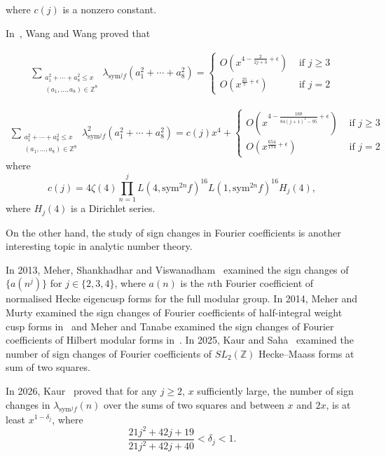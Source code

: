 \documentclass[10pt]{amsart}
\begin{document}
where $c(j)$ is a nonzero constant.


In~\cite{Junjie2026}, Wang and Wang proved that

\begin{align}
    \sum_{\substack{a_{1}^{2}+\cdots+a_{8}^{2}\leq x \\ (a_{1},\ldots,a_{8})\in\mathbb{Z}^{8}}}\lambda_{\mathrm{sym}^{j}f}(a_{1}^{2}+\cdots+a_{8}^{2}) = \begin{cases}
        O(x^{4-\frac{2}{2j+3}+\epsilon}) & \text{ if } j \geq 3 \\
        O(x^{\frac{25}{7}+\epsilon}) & \text{ if } j=2
    \end{cases}   
\end{align}

\begin{align*}
\sum_{\substack{a_{1}^{2}+\cdots+a_{8}^{2}\leq x \\ (a_{1},\ldots,a_{8})\in\mathbb{Z}^{8}}}\lambda^{2}_{\mathrm{sym}^{j}f}(a_{1}^{2}+\cdots+a_{8}^{2}) = c(j)x^4+\begin{cases}
    O(x^{4-\frac{168}{84(j+1)^2-95}+\epsilon}) & \text{ if } j \geq 3 \\
    O(x^{\frac{654}{174}+\epsilon}) & \text{ if } j =2
\end{cases}    
\end{align*}
where $$c(j) = 4\zeta(4)\prod_{n=1}^{j}L(4, \mathrm{sym}^{2n}f)^{16}L(1, \mathrm{sym}^{2n}f)^{16}H_j(4),$$
where $H_j(4)$ is a Dirichlet series. 

On the other hand, the study of sign changes in Fourier coefficients is another interesting topic in analytic number theory.  

In 2013, Meher, Shankhadhar and Viswanadham~\cite{Jaban2013} examined the sign changes of $\{a(n^j)\}$ for $ j\in\{ 2,3,4\}$, where $a(n)$ is the $n$th Fourier coefficient of normalised Hecke eigencusp forms for the full modular group. In 2014, Meher and Murty examined the sign changes of Fourier coefficients of half-integral weight cusp forms in~\cite{Jaban2014_1} and Meher and Tanabe examined the sign changes of Fourier coefficients of Hilbert modular forms in~\cite{Jaban2014}.  In 2025, Kaur and Saha~\cite{Kaur2025} examined the number of sign changes of Fourier coefficients of $SL_2(\mathbb{Z})$ Hecke–Maass forms at sum of two squares. 

In 2026, Kaur~\cite{Kaur2026} proved that for any $j \geq 2$, $x$ sufficiently large, the number of sign changes in $\lambda_{\mathrm{sym}^jf}(n)$ over the sums of two squares and between $x$ and $2x$, is at least $x^{1-\delta_j}$, where $$\frac{21j^2+42j+19}{21j^2+42j+40}< \delta_j < 1.$$
\end{document}

